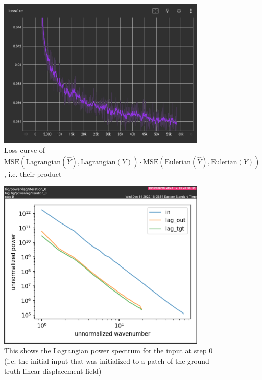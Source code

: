 \documentclass{article}
\begin{document}
\begin{figure}[h]
    \centering
    \includegraphics[width=10cm]{figs/lxe-loss.png}
    \caption{Loss curve of $\mbox{MSE} \left( \mbox{Lagrangian}(\hat{Y}), \mbox{Lagrangian}(Y) \right) \cdot \mbox{MSE} \left( \mbox{Eulerian}(\hat{Y}), \mbox{Eulerian}(Y) \right)$, i.e. their product}
    \label{fig:lxe-loss}
\end{figure}

\begin{figure}[h]
    \centering
    \includegraphics[width=10cm]{figs/initial-lag-pow-spec.png}
    \caption{This shows the Lagrangian power spectrum for the input at step 0 (i.e. the initial input that was initialized to a patch of the ground truth linear displacement field)}
    \label{fig:init-lag-pow}
\end{figure}
\end{document}
